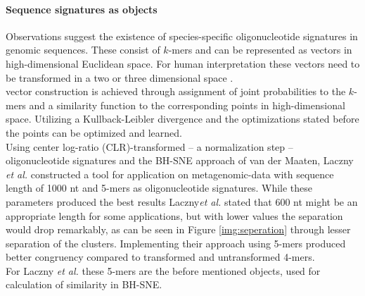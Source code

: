 \documentclass[twocolumn]{bmcart}%
\begin{document}
\paragraph*{Sequence signatures as objects}
Observations suggest the existence of species-specific oligonucleotide signatures in genomic sequences\cite{Laczny2014,Cheng1194}. These consist of $k$-mers and can be represented as vectors in high-dimensional Euclidean space. For human interpretation these vectors need to be transformed in a two or three dimensional space \cite{Laczny2014}.\\
vector construction is achieved through assignment of joint probabilities to the $k$-mers and a similarity function to the corresponding points in high-dimensional space. Utilizing a Kullback-Leibler divergence and the optimizations stated before the points can be optimized and learned.\\
Using center log-ratio (CLR)-transformed -- a normalization step -- oligonucleotide signatures and the BH-SNE approach of van der Maaten, Laczny \textit{et al.} constructed a tool for application on metagenomic-data with sequence length of 1000 nt and 5-mers as oligonucleotide signatures. While these parameters produced the best results Laczny\textit{et al.} stated that 600 nt might be an appropriate length for some applications, but with lower values the separation would drop remarkably, as can be seen in Figure  \ref{img:seperation} through lesser separation of the clusters. Implementing their approach using 5-mers produced better congruency compared to transformed and untransformed 4-mers.\\
For Laczny \textit{et al.} these 5-mers are the before mentioned objects, used for calculation of similarity in BH-SNE.
\end{document}
